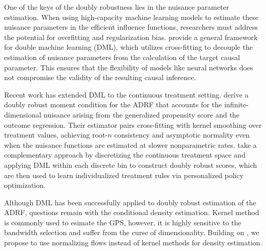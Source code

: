 \documentclass[12pt]{article}
\theoremstyle{definition}
\begin{document}


One of the keys of the doubly robustness lies in the nuisance parameter estimation. When using high-capacity machine learning models to estimate these nuisance parameters in the efficient influence functions, researchers must address the potential for overfitting and regularization bias. \citet{chernozhukov2018double} provide a general framework for double machine learning (DML), which utilizes cross-fitting to decouple the estimation of nuisance parameters from the calculation of the target causal parameter. This ensures that the flexibility of models like neural networks does not compromise the validity of the resulting causal inference.

Recent work has extended DML to the continuous treatment setting. \citet{colangelo2026double} derive a doubly robust moment condition for the ADRF that accounts for the infinite-dimensional nuisance arising from the generalized propensity score and the outcome regression. Their estimator pairs cross-fitting with kernel smoothing over treatment values, achieving root-$n$ consistency and asymptotic normality even when the nuisance functions are estimated at slower nonparametric rates. \citet{zhang2026personalized} take a complementary approach by discretizing the continuous treatment space and applying DML within each discrete bin to construct doubly robust scores, which are then used to learn individualized treatment rules via personalized policy optimization.

Although DML has been successfully applied to doubly robust estimation of the ADRF, questions remain with the conditional density estimation. Kernel method is commonly used to esimate the GPS, however, it is highly sensitive to the bandwidth selection and suffer from the curse of dimensionality. Building on \citet{Zhang2025a}, we propose to use normalizing flows instead of kernel methods for density estimation.
\end{document}
